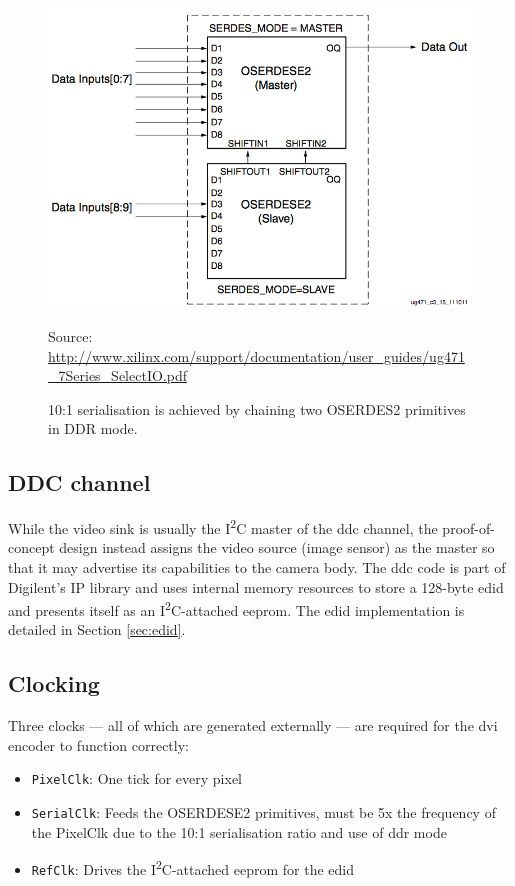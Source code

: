\begin{figure}
  \centering
  \includegraphics[width=1\textwidth]{./img/10_1_serdes.png}\par
Source: \url{http://www.xilinx.com/support/documentation/user_guides/ug471_7Series_SelectIO.pdf}
  \caption{10:1 serialisation is achieved by chaining two OSERDES2 primitives in DDR mode.}
  \label{fig:10_1_serdes}
\end{figure}

\subsection{DDC channel}

While the video sink is usually the I\textsuperscript{2}C master of the \gls{ddc} channel, the proof-of-concept design instead assigns the video source (image sensor) as the master so that it may advertise its capabilities to the camera body. The \gls{ddc} code is part of Digilent's IP library and uses internal memory resources to store a 128-byte \gls{edid} and presents itself as an I\textsuperscript{2}C-attached \gls{eeprom}. The \gls{edid} implementation is detailed in Section \ref{sec:edid}.

\subsection{Clocking}
Three clocks --- all of which are generated externally --- are required for the \gls{dvi} encoder to function correctly:
\begin{itemize}
    \item \texttt{PixelClk}: One tick for every pixel
    \item \texttt{SerialClk}: Feeds the OSERDESE2 primitives, must be 5x the frequency of the PixelClk due to the 10:1 serialisation ratio and use of \gls{ddr} mode
    \item \texttt{RefClk}: Drives the I\textsuperscript{2}C-attached \gls{eeprom} for the \gls{edid}
\end{itemize}


